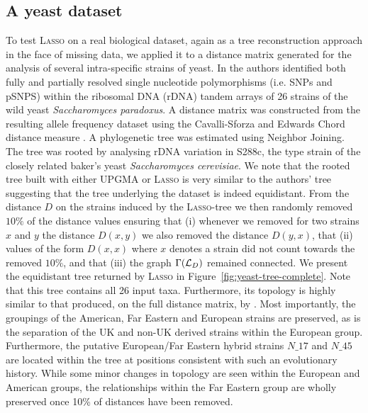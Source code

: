 \subsection{A yeast dataset}
\label{sec:yeast-dataset}

To test \textsc{Lasso} on a real biological dataset, again as a tree
reconstruction approach in the face of missing data, we applied it to a
distance matrix generated for the analysis of several intra-specific strains
of yeast.  In \cite{west14ribosomal} the authors identified both fully and
partially resolved single nucleotide polymorphisms (i.e. SNPs and pSNPS)
within the ribosomal DNA (rDNA) tandem arrays of 26 strains of the wild yeast
\textit{Saccharomyces paradoxus}.  A distance matrix was constructed from the
resulting allele frequency dataset using the Cavalli-Sforza and Edwards Chord
distance measure \cite{cavalli}.  A phylogenetic tree was estimated using
Neighbor Joining.  The tree was rooted by analysing rDNA variation in S288c,
the type strain of the closely related baker's yeast \textit{Saccharomyces
  cerevisiae}.  We note that the rooted tree built with either \textsc{UPGMA}
or \textsc{Lasso} is very similar to the authors' tree suggesting that the
tree underlying the dataset is indeed equidistant. From the distance $D$ on
the strains induced by the \textsc{Lasso}-tree we then randomly removed $10\%$
of the distance values ensuring that (i) whenever we removed for two strains
$x$ and $y$ the distance $D(x,y)$ we also removed the distance $D(y,x)$, that
(ii) values of the form $D(x,x)$ where $x$ denotes a strain did not count
towards the removed $10\%$, and that (iii) the graph $\Gamma({\mathcal L}_D)$ remained
connected. We present the equidistant tree returned by \textsc{Lasso} in
Figure~\ref{fig:yeast-tree-complete}.  Note that this tree contains all 26
input taxa. Furthermore, its topology is highly similar to that produced, on
the full distance matrix, by \cite{west14ribosomal}. Most importantly, the
groupings of the American, Far Eastern and European strains are preserved, as
is the separation of the UK and non-UK derived strains within the European
group. Furthermore, the putative European/Far Eastern hybrid strains $N\_17$
and $N\_45$ are located within the tree at positions consistent with such an
evolutionary history. While some minor changes in topology are seen within the
European and American groups, the relationships within the Far Eastern group
are wholly preserved once 10\% of distances have been removed.

